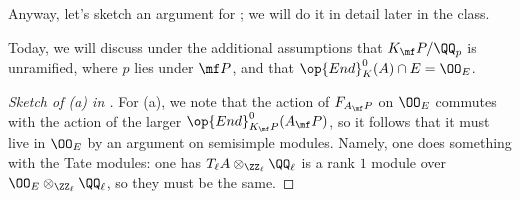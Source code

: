 \documentclass[../notes.tex]{subfiles}
\begin{document}
Anyway, let's sketch an argument for ; we will do it in detail later in the class.
\begin{warn}
	Today, we will discuss  under the additional assumptions that $K_\mf P/\QQ_p$ is unramified, where $p$ lies under $\mf P$, and that $\op{End}^0_K(A)\cap E=\OO_E$.
\end{warn}
\begin{proof}[Sketch of (a) in ]
	For (a), we note that the action of $F_{A_\mf P}$ on $\OO_E$ commutes with the action of the larger $\op{End}^0_{K_\mf P}(A_\mf P)$, so it follows that it must live in $\OO_E$ by an argument on semisimple modules. Namely, one does something with the Tate modules: one has $T_\ell A\otimes_{\ZZ_\ell}\QQ_\ell$ is a rank $1$ module over $\OO_E\otimes_{\ZZ_\ell}\QQ_\ell$, so they must be the same.
\end{proof}
\end{document}
